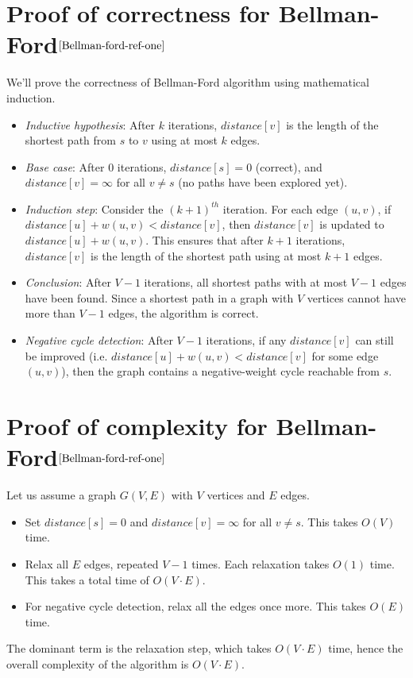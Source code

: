 \begin{appendices}
	\section{Proof of correctness for Bellman-Ford$^{\cite{Bellman-ford-ref-one}}$}\label{appendix:bellford:correctness}
	We'll prove the correctness of Bellman-Ford algorithm using mathematical induction.
	\begin{itemize}
		\item \textit{Inductive hypothesis}: After $k$ iterations, $distance[v]$ is the length of the shortest path from $s$ to $v$ using at most $k$ edges.
		\item \textit{Base case}: After 0 iterations, $distance[s]=0$ (correct), and $distance[v] = \infty$ for all $v \neq s$ (no paths have been explored yet).
		\item \textit{Induction step}: Consider the $(k+1)^{th}$ iteration. For each edge $(u,v)$, if $distance[u]+w(u,v)<distance[v]$, then $distance[v]$ is updated to $distance[u]+w(u,v)$. This ensures that after $k+1$ iterations, $distance[v]$ is the length of the shortest path using at most $k+1$ edges.
		\item \textit{Conclusion}: After $V-1$ iterations, all shortest paths with at most $V-1$ edges have been found. Since a shortest path in a graph with $V$ vertices cannot have more than $V-1$ edges, the algorithm is correct.
		\item \textit{Negative cycle detection}: After $V - 1$ iterations, if any $distance[v]$ can still be improved (i.e. $distance[u]+w(u,v)<distance[v]$ for some edge $(u,v)$), then the graph contains a negative-weight cycle reachable from $s$.
	\end{itemize}
	\section{Proof of complexity for Bellman-Ford$^{\cite{Bellman-ford-ref-one}}$}\label{appendix:bellford:complexity}
	Let us assume a graph $G(V, E)$ with $V$ vertices and $E$ edges.
	\begin{itemize}
		\item Set $distance[s]=0$ and $distance[v]=\infty$ for all $v \neq s$. This takes $O(V)$ time.
		\item Relax all $E$ edges, repeated $V - 1$ times. Each relaxation takes $O(1)$ time. This takes a total time of $O(V \cdot E)$.
		\item For negative cycle detection, relax all the edges once more. This takes $O(E)$ time.
	\end{itemize}
	The dominant term is the relaxation step, which takes $O(V \cdot E)$ time, hence the overall complexity of the algorithm is $O(V \cdot E)$.

\end{appendices}
